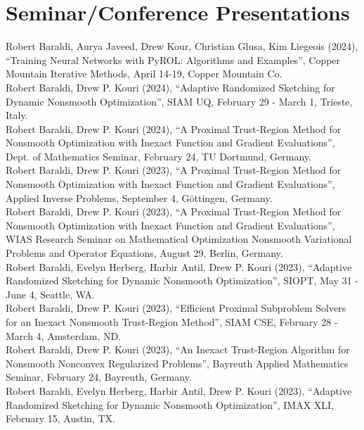 \documentclass[10pt, a4paper]{article}
\newcommand{\years}[1]{\marginnote{\scriptsize #1}}
\begin{document}
\section*{Seminar/Conference Presentations}
\noindent
\noindent
\years{2024} Robert Baraldi, Aurya Javeed, Drew Kour, Christian Glusa, Kim Liegeois (2024),  ``Training Neural Networks with PyROL: Algorithms and Examples'', Copper Mountain Iterative Methods, April 14-19, Copper Mountain Co. \\
\years{2024} Robert Baraldi, Drew P. Kouri (2024),  ``Adaptive Randomized Sketching for Dynamic Nonsmooth Optimization'', SIAM UQ, February 29 - March 1, Trieste, Italy. \\
\years{2024} Robert Baraldi, Drew P. Kouri (2024),  ``A Proximal Trust-Region Method for Nonsmooth Optimization with Inexact Function and Gradient Evaluations'', Dept. of Mathematics Seminar, February 24, TU Dortmund, Germany. \\
\years{2023} Robert Baraldi, Drew P. Kouri (2023),  ``A Proximal Trust-Region Method for Nonsmooth Optimization with Inexact Function and Gradient Evaluations'', Applied Inverse Problems, September 4, G{\"o}ttingen, Germany. \\
\years{2023} Robert Baraldi, Drew P. Kouri (2023),  ``A Proximal Trust-Region Method for Nonsmooth Optimization with Inexact Function and Gradient Evaluations'', WIAS Research Seminar on Mathematical Optimization
Nonsmooth Variational Problems and Operator Equations, August 29, Berlin, Germany. \\
\years{2023} Robert Baraldi, Evelyn Herberg, Harbir Antil, Drew P. Kouri (2023), ``Adaptive Randomized Sketching for Dynamic Nonsmooth Optimization'', SIOPT, May 31 - June 4, Seattle, WA. \\
\years{2023} Robert Baraldi, Drew P. Kouri (2023), ``Efficient Proximal Subproblem Solvers for an Inexact Nonsmooth Trust-Region Method'', SIAM CSE, February 28 - March 4, Amsterdam, ND. \\
\years{2023} Robert Baraldi, Drew P. Kouri (2023),  ``An Inexact Trust-Region Algorithm for Nonsmooth Nonconvex Regularized Problems'', Bayreuth Applied Mathematics Seminar, February 24, Bayreuth, Germany. \\
\years{2023} Robert Baraldi, Evelyn Herberg, Harbir Antil, Drew P. Kouri (2023), ``Adaptive Randomized Sketching for Dynamic Nonsmooth Optimization'', IMAX XLI, February 15, Austin, TX. \\
\end{document}

